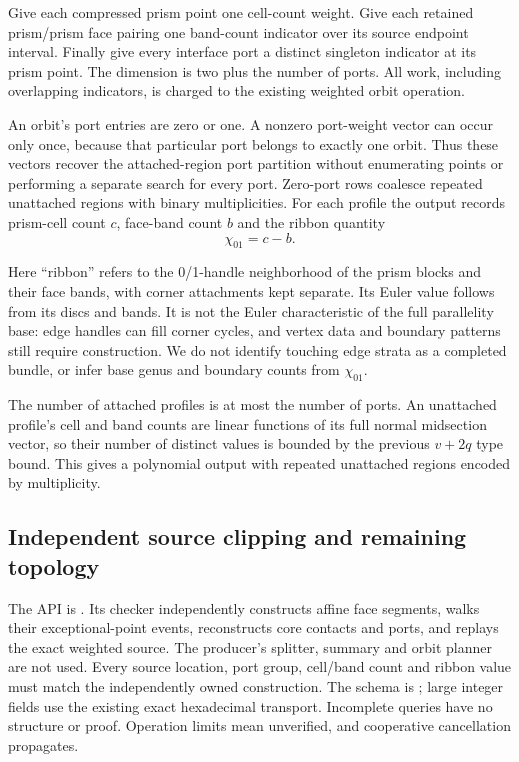 Give each compressed prism point one cell-count weight. Give each retained
prism/prism face pairing one band-count indicator over its source endpoint
interval. Finally give every interface port a distinct singleton indicator
at its prism point. The dimension is two plus the number of ports.
All work, including overlapping indicators, is charged to the existing
weighted orbit operation.

An orbit's port entries are zero or one. A nonzero port-weight vector can
occur only once, because that particular port belongs to exactly one orbit.
Thus these vectors recover the attached-region port partition without
enumerating points or performing a separate search for every port.
Zero-port rows coalesce repeated unattached regions with binary multiplicities.
For each profile the output records prism-cell count $c$, face-band count $b$
and the ribbon quantity
\[
                       \chi_{01}=c-b.
\]

Here ``ribbon'' refers to the 0/1-handle neighborhood of the prism blocks
and their face bands, with corner attachments kept separate. Its Euler
value follows from its discs and bands. It is not the Euler characteristic
of the full parallelity base: edge handles can fill corner cycles, and
vertex data and boundary patterns still require construction. We do not
identify touching edge strata as a completed bundle, or infer base genus
and boundary counts from $\chi_{01}$.

The number of attached profiles is at most the number of ports. An unattached
profile's cell and band counts are linear functions of its full normal
midsection vector, so their number of distinct values is bounded by the
previous $v+2q$ type bound. This gives a polynomial output with repeated
unattached regions encoded by multiplicity.

\subsection{Independent source clipping and remaining topology}

The API is . Its checker independently
constructs affine face segments, walks their exceptional-point events,
reconstructs core contacts and ports, and replays the exact weighted source.
The producer's splitter, summary and orbit planner are not used.
Every source location, port group, cell/band count and ribbon value must
match the independently owned construction. The schema is
; large integer fields use the existing
exact hexadecimal transport. Incomplete queries have no structure or proof.
Operation limits mean unverified, and cooperative cancellation propagates.

